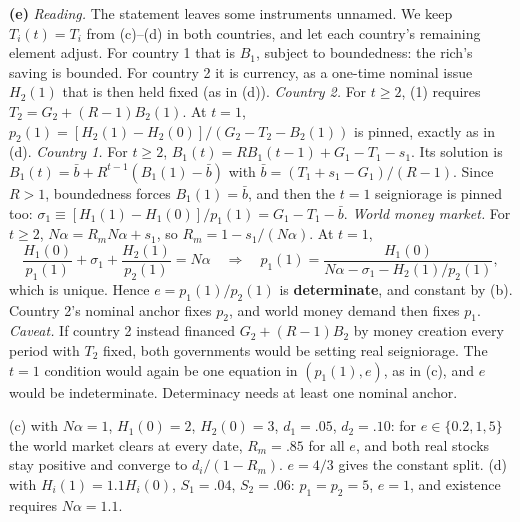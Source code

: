 \documentclass[12pt, letterpaper]{article}
\begin{document}
\begin{tcolorbox}[evenbox,title={Exercise 9.6 \quad Exchange rate determinacy}]
\textbf{(e)} \emph{Reading.} The statement leaves some instruments unnamed. We keep $T_i(t)=T_i$ from
(c)--(d) in both countries, and let each country's remaining element adjust. For country 1 that is
$B_1$, subject to boundedness: the rich's saving is bounded. For country 2 it is currency, as a
one-time nominal issue $H_2(1)$ that is then held fixed (as in (d)). \emph{Country 2.} For $t\ge2$,
(1) requires $T_2=G_2+(R-1)B_2(1)$. At $t=1$, $p_2(1)=[H_2(1)-H_2(0)]/(G_2-T_2-B_2(1))$ is pinned,
exactly as in (d). \emph{Country 1.} For $t\ge2$, $B_1(t)=RB_1(t-1)+G_1-T_1-s_1$. Its solution is
$B_1(t)=\bar b+R^{t-1}(B_1(1)-\bar b)$ with $\bar b=(T_1+s_1-G_1)/(R-1)$. Since $R>1$, boundedness
forces $B_1(1)=\bar b$, and then the $t=1$ seigniorage is pinned too:
$\sigma_1\equiv[H_1(1)-H_1(0)]/p_1(1)=G_1-T_1-\bar b$. \emph{World money market.} For $t\ge2$,
$N\alpha=R_mN\alpha+s_1$, so $R_m=1-s_1/(N\alpha)$. At $t=1$,
\[
\frac{H_1(0)}{p_1(1)}+\sigma_1+\frac{H_2(1)}{p_2(1)}=N\alpha
\quad\Longrightarrow\quad p_1(1)=\frac{H_1(0)}{N\alpha-\sigma_1-H_2(1)/p_2(1)} ,
\]
which is unique. Hence $e=p_1(1)/p_2(1)$ is \textbf{determinate}, and constant by (b). Country 2's
nominal anchor fixes $p_2$, and world money demand then fixes $p_1$. \emph{Caveat.} If country 2
instead financed $G_2+(R-1)B_2$ by money creation every period with $T_2$ fixed, both governments
would be setting real seigniorage. The $t=1$ condition would again be one equation in $(p_1(1),e)$,
as in (c), and $e$ would be indeterminate. Determinacy needs at least one nominal anchor.

\begin{tcolorbox}[databox]
(c) with $N\alpha=1$, $H_1(0)=2$, $H_2(0)=3$, $d_1=.05$, $d_2=.10$: for $e\in\{0.2,1,5\}$ the world
market clears at every date, $R_m=.85$ for all $e$, and both real stocks stay positive and converge to
$d_i/(1-R_m)$. $e=4/3$ gives the constant split. (d) with $H_i(1)=1.1H_i(0)$, $S_1=.04$, $S_2=.06$:
$p_1=p_2=5$, $e=1$, and existence requires $N\alpha=1.1$.
\end{tcolorbox}
\end{tcolorbox}
\end{document}
